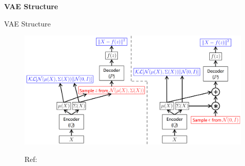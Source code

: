 \documentclass{beamer}
\begin{document}
{%
\begin{frame}
\begin{center}
{\bf\LARGE VAE Structure}
\end{center}
\end{frame}
}%
\begin{frame}{VAE Structure}
\begin{figure}
\includegraphics[width=0.95\columnwidth]{fig/vae_paper.png}
\begin{spacing}{1.5}
\textcolor{BGpurple}{\small
Ref: \citet[Tutorial on Variational Autoencoders]{doersch2016tutorial}}
\end{spacing}
\end{figure}
\end{frame}
\end{document}
